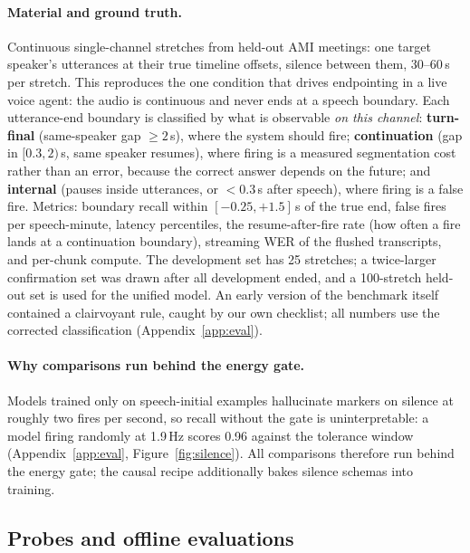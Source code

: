 \documentclass[11pt]{article}
\begin{document}
\paragraph{Material and ground truth.} Continuous single-channel stretches from held-out AMI meetings: one target speaker's utterances at their true timeline offsets, silence between them, 30--60\,s per stretch. This reproduces the one condition that drives endpointing in a live voice agent: the audio is continuous and never ends at a speech boundary. Each utterance-end boundary is classified by what is observable \emph{on this channel}: \textbf{turn-final} (same-speaker gap ${\geq}2$\,s), where the system should fire; \textbf{continuation} (gap in $[0.3,2)$\,s, same speaker resumes), where firing is a measured segmentation cost rather than an error, because the correct answer depends on the future; and \textbf{internal} (pauses inside utterances, or ${<}0.3$\,s after speech), where firing is a false fire. Metrics: boundary recall within $[-0.25,+1.5]$\,s of the true end, false fires per speech-minute, latency percentiles, the resume-after-fire rate (how often a fire lands at a continuation boundary), streaming WER of the flushed transcripts, and per-chunk compute. The development set has 25 stretches; a twice-larger confirmation set was drawn after all development ended, and a 100-stretch held-out set is used for the unified model. An early version of the benchmark itself contained a clairvoyant rule, caught by our own checklist; all numbers use the corrected classification (Appendix~\ref{app:eval}).

\paragraph{Why comparisons run behind the energy gate.} Models trained only on speech-initial examples hallucinate markers on silence at roughly two fires per second, so recall without the gate is uninterpretable: a model firing randomly at 1.9\,Hz scores 0.96 against the tolerance window (Appendix~\ref{app:eval}, Figure~\ref{fig:silence}). All comparisons therefore run behind the energy gate; the causal recipe additionally bakes silence schemas into training.

\subsection{Probes and offline evaluations}
\label{sec:probes}
\end{document}
